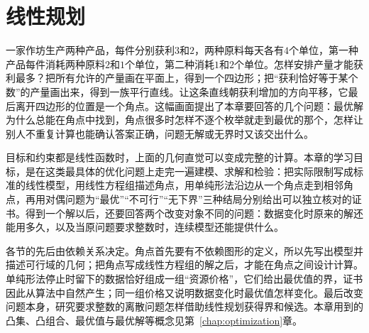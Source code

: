 \chapter{线性规划}
\label{chap:opt-linear-programming}

一家作坊生产两种产品，每件分别获利$3$和$2$，两种原料每天各有$4$个单位，第一种产品每件消耗两种原料$2$和$1$个单位，第二种消耗$1$和$2$个单位。怎样安排产量才能获利最多？把所有允许的产量画在平面上，得到一个四边形；把“获利恰好等于某个数”的产量画出来，得到一族平行直线。让这条直线朝获利增加的方向平移，它最后离开四边形的位置是一个角点。这幅画面提出了本章要回答的几个问题：最优解为什么总能在角点中找到，角点很多时怎样不逐个枚举就走到最优的那个，怎样让别人不重复计算也能确认答案正确，问题无解或无界时又该交出什么。

目标和约束都是线性函数时，上面的几何直觉可以变成完整的计算。本章的学习目标，是在这类最具体的优化问题上走完一遍建模、求解和检验：把实际限制写成标准的线性模型，用线性方程组描述角点，用单纯形法沿边从一个角点走到相邻角点，再用对偶问题为“最优”“不可行”“无下界”三种结局分别给出可以独立核对的证书。得到一个解以后，还要回答两个改变对象不同的问题：数据变化时原来的解还能用多久，以及当原问题要求整数时，连续模型还能提供什么。

各节的先后由依赖关系决定。角点首先要有不依赖图形的定义，所以先写出模型并描述可行域的几何；把角点写成线性方程组的解之后，才能在角点之间设计计算。单纯形法停止时留下的数据恰好组成一组“资源价格”，它们给出最优值的界，证书因此从算法中自然产生；同一组价格又说明数据变化时最优值怎样变化。最后改变问题本身，研究要求整数的离散问题怎样借助线性规划获得界和候选。本章用到的凸集、凸组合、最优值与最优解等概念见第~\ref{chap:optimization}章。








